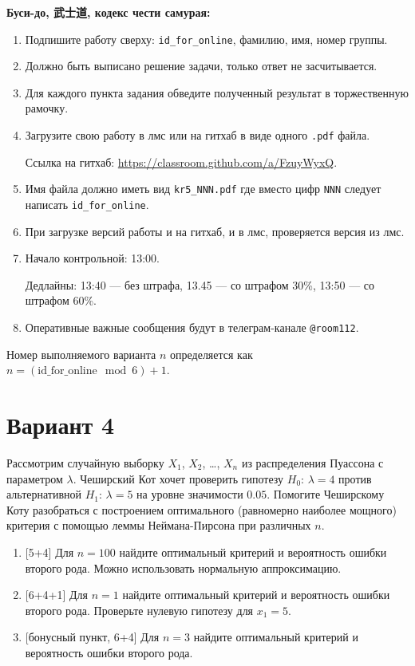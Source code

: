 \documentclass[12pt]{article}
\newcommand \id {\mathrm{id}\_\mathrm{for}\_\mathrm{online}}
\begin{document}
\vspace{15mm}


\textbf{Буси-до, 武士道, кодекс чести самурая:}

\vspace{5mm}

\begin{enumerate}
\item Подпишите работу сверху: \verb|id_for_online|, фамилию, имя, номер группы.
\item Должно быть выписано решение задачи, только ответ не засчитывается.
\item Для каждого пункта задания обведите полученный результат в торжественную рамочку.
\item Загрузите свою работу в лмс или на гитхаб в виде одного \verb|.pdf| файла.

Ссылка на гитхаб: \url{https://classroom.github.com/a/FzuyWyxQ}.
\item Имя файла должно иметь вид \verb|kr5_NNN.pdf| где вместо цифр \verb|NNN| следует написать \verb|id_for_online|.
\item При загрузке версий работы и на гитхаб, и в лмс, проверяется версия из лмс. 
\item Начало контрольной: 13:00. 

Дедлайны: 13:40 — без штрафа, 13.45 — со штрафом 30\%, 13:50 — со штрафом 60\%.
\item Оперативные важные сообщения будут в телеграм-канале \verb|@room112|.
\end{enumerate}


\newpage

Номер выполняемого варианта $n$ определяется как $n=(\id \mod 6)+1$. 

\section*{Вариант 4}


Рассмотрим случайную выборку $X_1$, $X_2$, \ldots, $X_n$ из распределения Пуассона с параметром $\lambda$. 
Чеширский Кот хочет проверить гипотезу $H_0$: $\lambda = 4$ против альтернативной $H_1$: $\lambda = 5$ на уровне
значимости $0.05$. Помогите Чеширскому Коту разобраться с построением оптимального (равномерно наиболее мощного)
критерия с помощью леммы Неймана-Пирсона при различных $n$.

\begin{enumerate}
  \item {[5+4]} Для $n=100$ найдите оптимальный критерий и вероятность ошибки второго рода. Можно использовать нормальную аппроксимацию.
  \item {[6+4+1]} Для $n=1$ найдите оптимальный критерий и вероятность ошибки второго рода. Проверьте нулевую гипотезу для $x_1 = 5$. 
  \item {[бонусный пункт, 6+4]} Для $n=3$ найдите оптимальный критерий и вероятность ошибки второго рода.
\end{enumerate}
\end{document}
